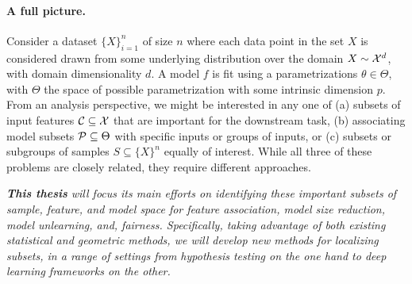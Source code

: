 \paragraph{A full picture.} Consider a dataset $\{X\}_{i=1}^n$ of size $n$ where each data point in the set $X$ is considered drawn from some underlying distribution over the domain $X \sim \mathcal{X}^d$, with domain dimensionality $d$. A model $f$ is fit using a parametrizations $\theta \in \Theta$, with $\Theta$ the space of possible parametrization with some intrinsic dimension $p$. From an analysis perspective, we might be interested in any one of (a) subsets of input features $\mathcal{C} \subseteq \mathcal{X}$ that are important for the downstream task, (b) associating model subsets $\mathcal{P} \subseteq \Theta$ with specific inputs or groups of inputs, or (c) subsets or subgroups of samples $S \subseteq \{X\}^n$ equally of interest. While all three of these problems are closely related, they require different approaches. 

\begin{mdframed}[style=MyFrame]
\em 
\textbf{This thesis} will focus its main efforts on identifying these important subsets of sample, feature, and model space for feature association, model size reduction, model unlearning, and, fairness. Specifically, taking advantage of both existing statistical and geometric methods, we will develop new methods for localizing subsets, in a range of settings from hypothesis testing on the one hand to deep learning frameworks on the other.
\end{mdframed}

